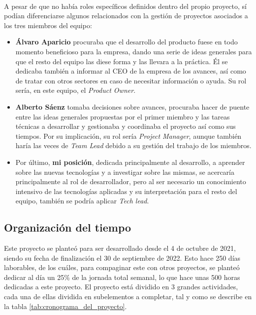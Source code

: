 \documentclass{subfiles}
\begin{document}
        \paragraph{}
        A pesar de que no había roles específicos definidos dentro del propio proyecto, sí podían diferenciarse algunos relacionados con la gestión de proyectos asociados a los tres miembros del equipo:
        \begin{itemize}
            \item \textbf{Álvaro Aparicio} procuraba que el desarrollo del producto fuese en todo momento beneficioso para la empresa, dando una serie de ideas generales para que el resto del equipo las diese forma y las llevara a la práctica. Él se dedicaba también a informar al CEO de la empresa de los avances, así como de tratar con otros sectores en caso de necesitar información o ayuda. Su rol sería, en este equipo, el \textit{Product Owner}.
            
            \item \textbf{Alberto Sáenz} tomaba decisiones sobre avances, procuraba hacer de puente entre las ideas generales propuestas por el primer miembro y las tareas técnicas a desarrollar y gestionaba y coordinaba el proyecto así como sus tiempos. Por su implicación, su rol sería \textit{Project Manager}, aunque también haría las veces de \textit{Team Lead} debido a su gestión del trabajo de los miembros.
            
            \item Por último, \textbf{mi posición}, dedicada principalmente al desarrollo, a aprender sobre las nuevas tecnologías y a investigar sobre las mismas, se acercaría principalmente al rol de desarrollador, pero al ser necesario un conocimiento intensivo de las tecnologías aplicadas y su interpretación para el resto del equipo, también se podría aplicar \textit{Tech lead}.
        \end{itemize}

        \subsection{Organización del tiempo}
        \label{sec:organizacion_del_tiempo}

        Este proyecto se planteó para ser desarrollado desde el 4 de octubre de 2021, siendo su fecha de finalización el 30 de septiembre de 2022. Esto hace 250 días laborables, de los cuáles, para compaginar este con otros proyectos, se planteó dedicar al día un 25\% de la jornada total semanal, lo que hace unas 500 horas dedicadas a este proyecto. El proyecto está dividido en 3 grandes actividades, cada una de ellas dividida en subelementos a completar, tal y como se describe en la tabla \ref{tab:cronograma_del_proyecto}.
\end{document}
